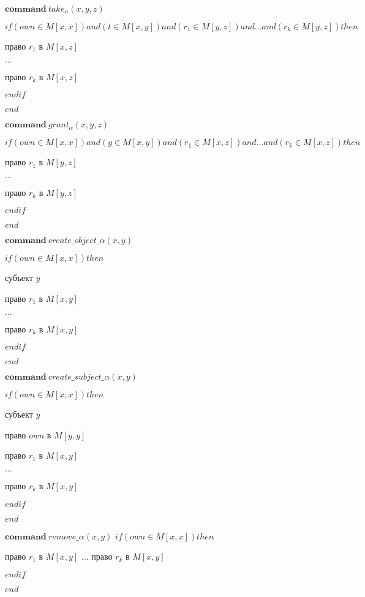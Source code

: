 \begin{multicols}{2}
	\begin{itemize*}
		\item $\mathbf{command} \  take_{\alpha}(x,y,z)$

		$if (own \in M[x,x]) and (t \in M[x,y])and (r_1 \in M[y,z])and  \ldots and (r_k \in M[y,z]) then $

		 право $r_1$ в $M[x,z]$

		$\ldots$

		 право $r_k$ в $M[x,z]$

		$endif$

		$end$

		\item 		$\mathbf{command} \  grant_{\alpha}(x,y,z)$

				$if (own \in M[x,x]) and (g \in M[x,y])and (r_1 \in M[x,z])and  \ldots and (r_k \in M[x,z]) then $

				 право $r_1$ в $M[y,z]$

				$\ldots$

				 право $r_k$ в $M[y,z]$

				$endif$

				$end$
		\end{itemize*}
		\begin{itemize*}
		\item 		$\mathbf{command} \ create\_object\_\alpha(x,y)$

				$if (own \in M[x,x]) then $

				 субъект $y$

				 право $r_1$ в $M[x,y]$

				$\ldots$

				 право $r_k$ в $M[x,y]$

				$endif$

				$end$

		\item 		$\mathbf{command} \ create\_subject\_\alpha(x,y)$

				$if (own \in M[x,x]) then $

				 субъект $y$

				 право $own$ в $M[y,y]$

				 право $r_1$ в $M[x,y]$

				$\ldots$

				 право $r_k$ в $M[x,y]$

				$endif$

				$end$
			\end{itemize*}
			\begin{itemize*}

			\item 		$\mathbf{command} \ remove\_\alpha(x,y)$
					$if (own \in M[x,x]) then $

					 право $r_1$ в $M[x,y]$
					$\ldots$
					 право $r_k$ в $M[x,y]$

					$endif$

					$end$

	\end{itemize*}

\end{multicols}

